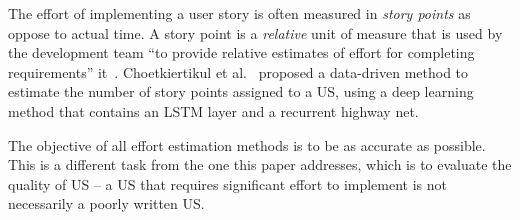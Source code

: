 The effort of implementing a user story is often measured in \emph{story points} as oppose to actual time. 
A story point is a \emph{relative} unit of measure that is used by the development team ``to provide relative estimates of effort for completing requirements'' it~\cite{story_point_definition}. 
Choetkiertikul et al.~\cite{choetkiertikul2018deep} proposed a data-driven method to estimate the number of story points assigned to a US, using a deep learning method that contains an LSTM layer and a recurrent highway net.



The objective of all effort estimation methods is to be as accurate as possible. 
This is a different task from the one this paper addresses, which is to evaluate the quality of US -- a US that requires significant effort to implement is not necessarily a poorly written US. 


